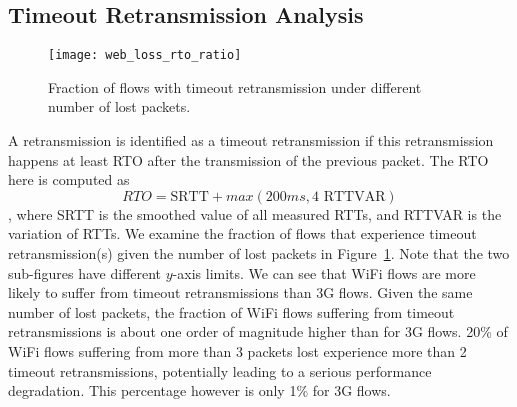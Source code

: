 \subsection{Timeout Retransmission Analysis}

\begin{figure}[th]
\centering
\texttt{[image: web\_loss\_rto\_ratio]}
\caption{Fraction of flows with timeout retransmission under different number of lost packets.}
\label{fig:web_loss_rto_ratio}
\minsqueeze
\end{figure}


A retransmission is identified as a timeout retransmission if this retransmission happens at least RTO after the transmission of the previous packet. The RTO here is computed as~\cite{rfc62982011computing} $$RTO=\text{SRTT} + max(200ms, 4 \text{ RTTVAR})$$, where SRTT is the smoothed value of all measured RTTs, and RTTVAR is the variation of RTTs. We examine the fraction of flows that experience timeout retransmission(s) given the number of lost packets in Figure~\ref{fig:web_loss_rto_ratio}. Note that the two sub-figures have different $y$-axis limits. We can see that WiFi flows are more likely to suffer from timeout retransmissions than 3G flows. Given the same number of lost packets, the fraction of WiFi flows suffering from timeout retransmissions is about one order of magnitude higher than for 3G flows. 20\% of WiFi flows suffering from more than 3 packets lost experience more than 2 timeout retransmissions, potentially leading to a serious performance degradation. This percentage however is only 1\% for 3G flows.


